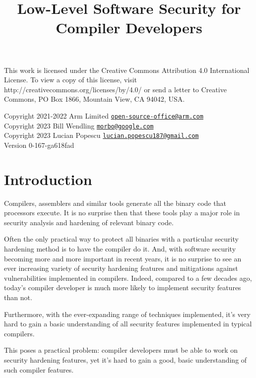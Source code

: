 \documentclass[a4paper,]{report}
\title{Low-Level Software Security for Compiler Developers}
\date{}
\begin{document}
\maketitle

\clearpage

\vspace*{\fill}
This work is licensed under the Creative Commons Attribution 4.0 International
License. To view a copy of this license, visit
http://creativecommons.org/licenses/by/4.0/ or send a letter to Creative
Commons, PO Box 1866, Mountain View, CA 94042, USA.

  Copyright 2021-2022 Arm Limited
  \href{mailto:open-source-office@arm.com}{\nolinkurl{open-source-office@arm.com}}\\
  Copyright 2023 Bill Wendling
  \href{mailto:morbo@google.com}{\nolinkurl{morbo@google.com}}\\
  Copyright 2023 Lucian Popescu
  \href{mailto:lucian.popescu187@gmail.com}{\nolinkurl{lucian.popescu187@gmail.com}}\\

Version 0-167-ga618fad
\clearpage

{
\hypersetup{linkcolor=}
\setcounter{tocdepth}{2}
\tableofcontents
}
\hypertarget{introduction}{%
\chapter{Introduction}\label{introduction}}

Compilers, assemblers and similar tools generate all the binary code
that processors execute. It is no surprise then that these tools play a
major role in security analysis and hardening of relevant binary code.

Often the only practical way to protect all binaries with a particular
security hardening method is to have the compiler do it. And, with
software security becoming more and more important in recent years, it
is no surprise to see an ever increasing variety of security hardening
features and mitigations against vulnerabilities implemented in
compilers. Indeed, compared to a few decades ago, today's compiler
developer is much more likely to implement security features than not.

Furthermore, with the ever-expanding range of techniques implemented,
it's very hard to gain a basic understanding of all security features
implemented in typical compilers.

This poses a practical problem: compiler developers must be able to work
on security hardening features, yet it's hard to gain a good, basic
understanding of such compiler features.
\end{document}
